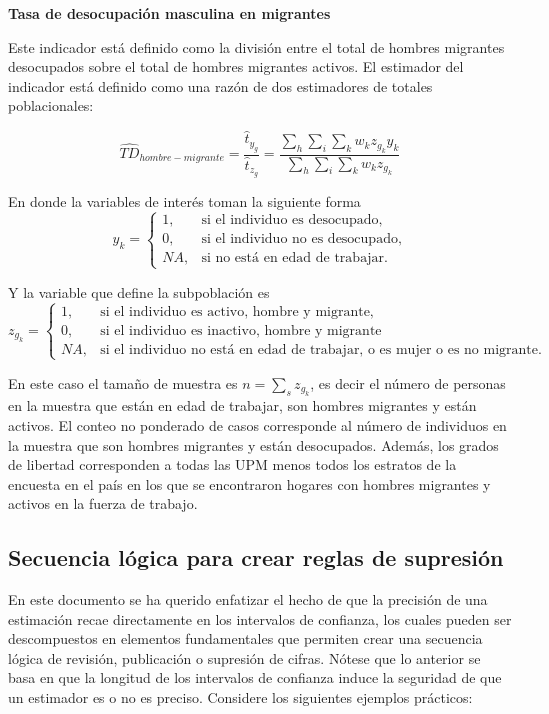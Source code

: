 \documentclass[12pt,spanish,]{book}
\begin{document}
\textbf{Tasa de desocupación masculina en migrantes}

Este indicador está definido como la división entre el total de hombres migrantes desocupados sobre el total de hombres migrantes activos. El estimador del indicador está definido como una razón de dos estimadores de totales poblacionales:

\[
\widehat{TD}_{hombre-migrante} =  \frac{\hat t_{y_g}}{\hat t_{z_g}} =\frac{\sum_h\sum_i\sum_k w_kz_{g_k}y_{k}}{\sum_h\sum_i\sum_k w_kz_{g_k}}
\]

En donde la variables de interés toman la siguiente forma
\[
y_{k}=
\begin{cases}
1, &\text{si el individuo es desocupado,}\\
0, &\text{si el individuo no es desocupado,}\\
NA, &\text{si no está en edad de trabajar.}
\end{cases}
\]

Y la variable que define la subpoblación es
\[
z_{g_k}=
\begin{cases}
1, &\text{si el individuo es activo, hombre y migrante,}\\
0, &\text{si el individuo es inactivo, hombre y migrante}\\
NA, &\text{si el individuo no está en edad de trabajar, o es mujer o es no migrante.}
\end{cases}
\]

En este caso el tamaño de muestra es \(n = \sum_s z_{g_k}\), es decir el número de personas en la muestra que están en edad de trabajar, son hombres migrantes y están activos. El conteo no ponderado de casos corresponde al número de individuos en la muestra que son hombres migrantes y están desocupados. Además, los grados de libertad corresponden a todas las UPM menos todos los estratos de la encuesta en el país en los que se encontraron hogares con hombres migrantes y activos en la fuerza de trabajo.

\hypertarget{secuencia-logica-para-crear-reglas-de-supresion}{%
\subsection{Secuencia lógica para crear reglas de supresión}\label{secuencia-logica-para-crear-reglas-de-supresion}}

En este documento se ha querido enfatizar el hecho de que la precisión de una estimación recae directamente en los intervalos de confianza, los cuales pueden ser descompuestos en elementos fundamentales que permiten crear una secuencia lógica de revisión, publicación o supresión de cifras. Nótese que lo anterior se basa en que la longitud de los intervalos de confianza induce la seguridad de que un estimador es o no es preciso. Considere los siguientes ejemplos prácticos:
\end{document}
